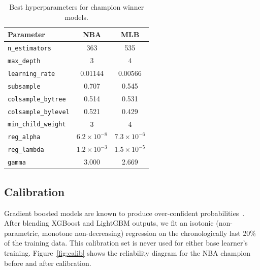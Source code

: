 \documentclass[conference]{IEEEtran}
\begin{document}
\begin{table}[t]
\centering
\caption{Best hyperparameters for champion winner models.}
\label{tab:bestparams}
\small
\begin{tabular}{lcc}
\toprule
\textbf{Parameter} & \textbf{NBA} & \textbf{MLB} \\
\midrule
\texttt{n\_estimators}      & 363       & 535 \\
\texttt{max\_depth}         & 3         & 4 \\
\texttt{learning\_rate}     & 0.01144   & 0.00566 \\
\texttt{subsample}          & 0.707     & 0.545 \\
\texttt{colsample\_bytree}  & 0.514     & 0.531 \\
\texttt{colsample\_bylevel} & 0.521     & 0.429 \\
\texttt{min\_child\_weight} & 3         & 4 \\
\texttt{reg\_alpha}         & $6.2{\times}10^{-8}$ & $7.3{\times}10^{-6}$ \\
\texttt{reg\_lambda}        & $1.2{\times}10^{-3}$ & $1.5{\times}10^{-5}$ \\
\texttt{gamma}              & 3.000     & 2.669 \\
\bottomrule
\end{tabular}
\end{table}

\subsection{Calibration}

Gradient boosted models are known to produce over-confident
probabilities~\cite{niculescu2005}.  After blending XGBoost and
LightGBM outputs, we fit an isotonic (non-parametric, monotone
non-decreasing) regression on the chronologically last 20\% of the
training data.  This calibration set is never used for either base
learner's training.  Figure~\ref{fig:calib} shows the reliability
diagram for the NBA champion before and after calibration.
\end{document}
